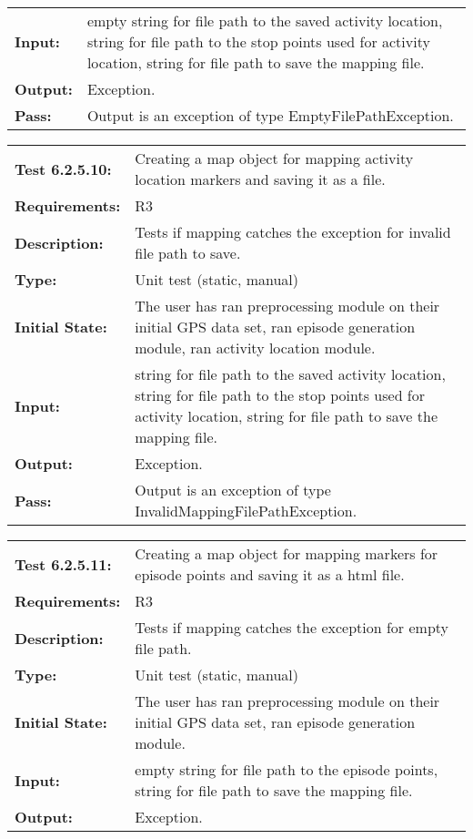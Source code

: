 \documentclass[12pt, titlepage]{article}
\begin{document}
{\begin{tabular}{|l|p{10cm}|}
    \bf{Input}: & empty string for file path to the saved activity location, string for file path to the stop points used for activity location, string for file path to save the mapping file. \\
    \bf{Output}: & Exception. \\
    \bf{Pass}: & Output is an exception of type EmptyFilePathException. \\
    \hline
\end{tabular}
\begin{tabular}{|l|p{10cm}|}
    \hline
    \bf{Test} 6.2.5.10: & Creating a map object for mapping activity location markers and saving it as a file.\\
    \bf{Requirements}: &  R3\\
    \bf{Description}: & Tests if mapping catches the exception for invalid file path to save. \\
    \bf{Type}: & Unit test (static, manual) \\
    \bf{Initial State}: & The user has ran preprocessing module on their initial GPS data set, ran episode generation module, ran activity location module. \\
    \bf{Input}: & string for file path to the saved activity location, string for file path to the stop points used for activity location, string for file path to save the mapping file. \\
    \bf{Output}: & Exception. \\
    \bf{Pass}: & Output is an exception of type InvalidMappingFilePathException. \\
    \hline
\end{tabular}
\begin{tabular}{|l|p{10cm}|}
    \hline
    \bf{Test} 6.2.5.11: & Creating a map object for mapping markers for episode points and saving it as a html file.\\
    \bf{Requirements}: &  R3\\
    \bf{Description}: & Tests if mapping catches the exception for empty file path. \\
    \bf{Type}: & Unit test (static, manual) \\
    \bf{Initial State}: & The user has ran preprocessing module on their initial GPS data set, ran episode generation module. \\
    \bf{Input}: & empty string for file path to the episode points, string for file path to save the mapping file. \\
    \bf{Output}: & Exception. \\

\end{tabular}}
\end{document}
